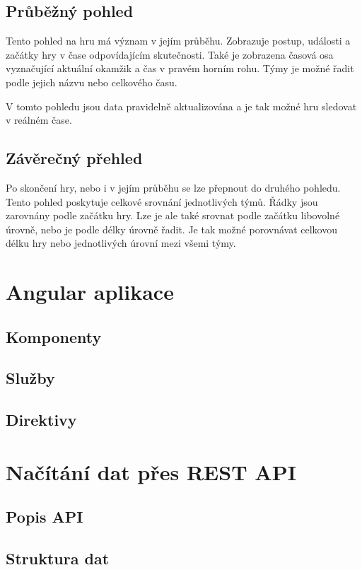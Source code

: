 \documentclass[
  digital, %
  oneside, %
  table,   %
  nolof,     %
  nolot,     %
]{fithesis3}
\begin{document}
\subsection{Průběžný pohled}
Tento pohled na hru má význam v jejím průběhu. Zobrazuje postup, události a začátky hry v čase odpovídajícím skutečnosti. Také je zobrazena časová osa vyznačující aktuální okamžik a čas v pravém horním rohu. Týmy je možné řadit podle jejich názvu nebo celkového času.\par
V tomto pohledu jsou data pravidelně aktualizována a je tak možné hru sledovat v reálném čase.
\subsection{Závěrečný přehled}%
Po skončení hry, nebo i v jejím průběhu se lze přepnout do druhého pohledu. Tento pohled poskytuje celkové srovnání jednotlivých týmů. Řádky jsou zarovnány podle začátku hry. Lze je ale také srovnat podle začátku libovolné úrovně, nebo je podle délky úrovně řadit. Je tak možné porovnávat celkovou délku hry nebo jednotlivých úrovní mezi všemi týmy.

\section{Angular aplikace}
\subsection{Komponenty}
\subsection{Služby}
\subsection{Direktivy}

\section{Načítání dat přes REST API}

\subsection{Popis API}
\subsection{Struktura dat}
\end{document}
